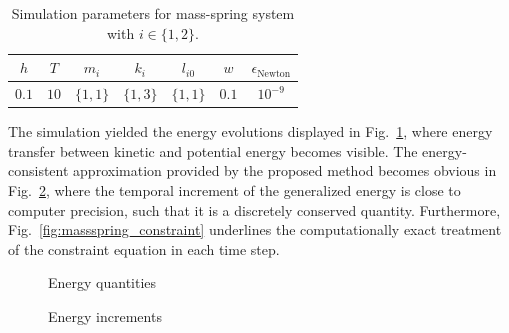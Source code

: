\documentclass{multibody2023_full_paper}
\newlength\figH
\newlength\figW
\begin{document}

\begin{table}[tb]
    \begin{center}
        \caption{Simulation parameters for mass-spring system with $i \in \{1,2\}$.}
        \vspace{1mm}
        \begin{tabular}{*{7}{|c}|}
            \hline
            $h$   & $T$  & $m_i$      & $k_i$        & $l_{i0}$     & $w$   & $\epsilon_\mathrm{Newton}$ \\
            \hline
            $0.1$ & $10$ & $\{1, 1\}$ & $\{ 1, 3 \}$ & $\{ 1, 1 \}$ & $0.1$ & $10^{-9}$                  \\
            \hline
        \end{tabular}
        \label{tab:tab1}
    \end{center}
\end{table}

The simulation yielded the energy evolutions displayed in Fig.~\ref{fig:massspring_energy}, where energy transfer between kinetic and potential energy becomes visible. The energy-consistent approximation provided by the proposed method becomes obvious in Fig.~\ref{fig:massspring_energy_diff}, where the temporal increment of the generalized energy is close to computer precision, such that it is a discretely conserved quantity. Furthermore, Fig.~\ref{fig:massspring_constraint} underlines the computationally exact treatment of the constraint equation in each time step.

\begin{figure}[b!]
    \centering
    \setlength{\figH}{0.18\textheight}
    \setlength{\figW}{0.6\textwidth}
    
    \caption{Energy quantities}
    \label{fig:massspring_energy}
\end{figure}

\begin{figure}[b!]
    \centering
    \hspace*{-10mm}
    \setlength{\figH}{0.18\textheight}
    \setlength{\figW}{0.6\textwidth}
    
    \caption{Energy increments}
    \label{fig:massspring_energy_diff}
\end{figure}
\end{document}
